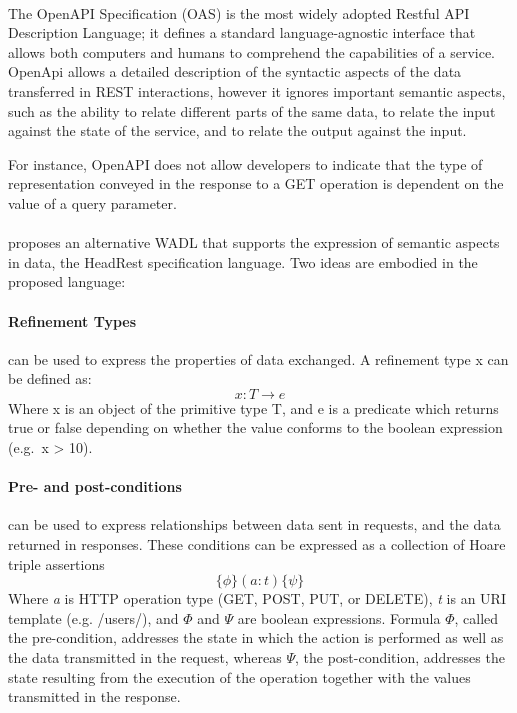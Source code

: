 \paragraph{}

The OpenAPI Specification (OAS) \cite{openAPI} is the most widely adopted Restful API Description Language;
it defines a standard language-agnostic interface that allows both computers and humans to comprehend the capabilities of a service.
OpenApi allows a detailed description of the syntactic aspects of the data transferred in REST interactions, however it ignores important semantic aspects, such as the ability to relate
different parts of the same data, to relate the input against the state of the service, and to relate the output against the input.

For instance, OpenAPI does not allow developers to indicate that the type of representation conveyed in the response to a GET operation is dependent on the value of a query parameter.

\paragraph{}

\citeauthor{headRest} \cite{headRest} proposes an alternative WADL that supports the expression of semantic aspects in data, the HeadRest specification language.
Two ideas are embodied in the proposed language:

\paragraph{Refinement Types} \cite{freeman1991refinement} can be used to express the properties of data exchanged.
A refinement type x can be defined as:
\[ x:T \rightarrow e \]
Where x is an object of the primitive type T, and e is a predicate which returns true or false depending on whether the value conforms to the boolean expression (e.g.\ x > 10).

\paragraph{Pre- and post-conditions} can be used to express relationships between data sent in
requests, and the data returned in responses. These conditions can be expressed as a collection of Hoare triple assertions
\[ \{\phi\} (a : t) \{\psi\} \]
Where \emph{a} is HTTP operation type (GET, POST, PUT, or DELETE), \emph{t} is an URI template (e.g. /users/), and $\Phi$ and $\Psi$ are boolean expressions.
Formula $\Phi$, called the pre-condition, addresses the state in which the action is performed as well as the data transmitted in the request,
whereas $\Psi$, the post-condition, addresses the state resulting from the execution of the operation together with the values transmitted in the response.

